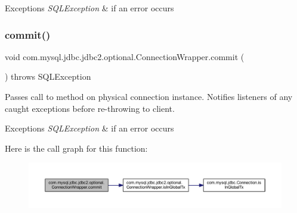 \begin{DoxyExceptions}{Exceptions}
{\em S\+Q\+L\+Exception} & if an error occurs \\
\hline
\end{DoxyExceptions}
\mbox{\label{classcom_1_1mysql_1_1jdbc_1_1jdbc2_1_1optional_1_1_connection_wrapper_a2765c010785f1fc2cbed1ac07c28a577}} 
\subsubsection{\texorpdfstring{commit()}{commit()}}
{\footnotesize\ttfamily void com.\+mysql.\+jdbc.\+jdbc2.\+optional.\+Connection\+Wrapper.\+commit (\begin{DoxyParamCaption}{ }\end{DoxyParamCaption}) throws S\+Q\+L\+Exception}

Passes call to method on physical connection instance. Notifies listeners of any caught exceptions before re-\/throwing to client.


\begin{DoxyExceptions}{Exceptions}
{\em S\+Q\+L\+Exception} & if an error occurs \\
\hline
\end{DoxyExceptions}
Here is the call graph for this function\+:
\nopagebreak
\begin{figure}[H]
\begin{center}
\leavevmode
\includegraphics[width=350pt]{classcom_1_1mysql_1_1jdbc_1_1jdbc2_1_1optional_1_1_connection_wrapper_a2765c010785f1fc2cbed1ac07c28a577_cgraph}
\end{center}
\end{figure}
\mbox{\label{classcom_1_1mysql_1_1jdbc_1_1jdbc2_1_1optional_1_1_connection_wrapper_ac6aae5147665c76090f38824b803b8f5}} 
